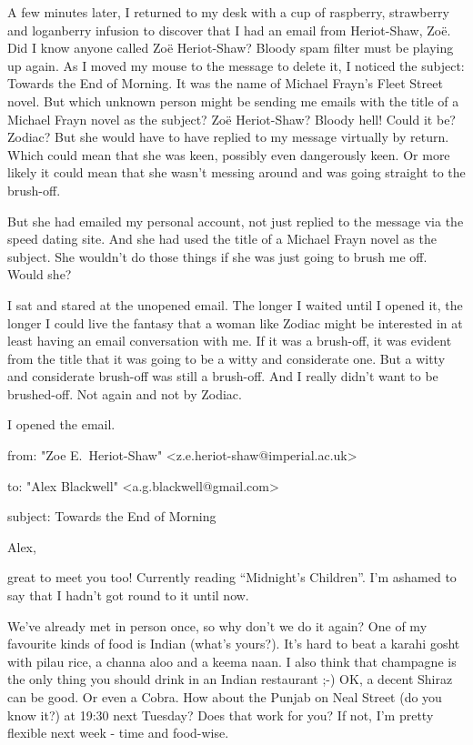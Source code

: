 A few minutes later, I returned to my desk with a cup of raspberry,
strawberry and loganberry infusion to discover that I had an email
from {\twelvett Heriot-Shaw, Zoë}. Did I know anyone called Zoë
Heriot-Shaw? Bloody spam filter must be playing up again. As I moved my
mouse to the message to delete it, I noticed the subject: {\twelvett
Towards the End of Morning}. It was the name of Michael Frayn's
Fleet Street novel. But which unknown person might be sending me
emails with the title of a Michael Frayn novel as the subject?
Zoë Heriot-Shaw? Bloody hell! Could it be? Zodiac? But she would have
to have replied to my message virtually by return. Which could mean
that she was keen, possibly even dangerously keen. Or more likely it
could mean that she wasn't messing around and was going straight to
the brush-off.

But she had emailed my personal account, not just replied to the
message via the speed dating site. And she had used the title of a
Michael Frayn novel as the subject. She wouldn't do those things if
she was just going to brush me off. Would she?

I sat and stared at the unopened email. The longer I waited until I
opened it, the longer I could live the fantasy that a woman like
Zodiac might be interested in at least having an email conversation
with me. If it was a brush-off, it was evident from the title that
it was going to be a witty and considerate one. But a witty and
considerate brush-off was still a brush-off. And I really didn't
want to be brushed-off. Not again and not by Zodiac.

I opened the email.

\startmessage
from: "Zoe E.~Heriot-Shaw" <z.e.heriot-shaw@imperial.ac.uk>

to: "Alex Blackwell" <a.g.blackwell@gmail.com>

subject: Towards the End of Morning

Alex,

great to meet you too! Currently reading ``Midnight's Children''. I'm
ashamed to say that I hadn't got round to it until now.

We've already met in person once, so why don't we do it again? One
of my favourite kinds of food is Indian (what's yours?). It's hard
to beat a karahi gosht with pilau rice, a channa aloo and a keema
naan. I also think that champagne is the only thing you should drink
in an Indian restaurant ;-) OK, a decent Shiraz can be good. Or even
a Cobra. How about the Punjab on Neal Street (do you know it?) at
19:30 next Tuesday? Does that work for you? If not, I'm pretty
flexible next week - time and food-wise.

